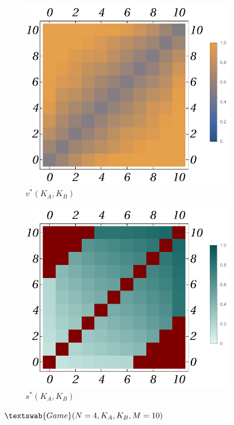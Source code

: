 \documentclass{article}
\theoremstyle{definition}
\newcommand{\G}[1]{$\textswab{Game}(#1)$}
\begin{document}
\begin{figure}[H]
    \centering
    \begin{subfigure}[b]{0.3\textwidth}
        \includegraphics[width=\textwidth]{img/v_Plot_4_10.pdf}
        \caption{$v^*(K_A,K_B)$}
        \label{fig:sub11}
    \end{subfigure}
    \hspace{0.05\textwidth} %
    \begin{subfigure}[b]{0.3\textwidth}
        \includegraphics[width=\textwidth]{img/s_Plot_4_10.pdf}
        \caption{$s^*(K_A,K_B)$}
        
    \end{subfigure}
    
    \caption{\G{N=4,K_A,K_B,M=10}}
    \label{fig:Game4__10_vs}
\end{figure}
\end{document}
